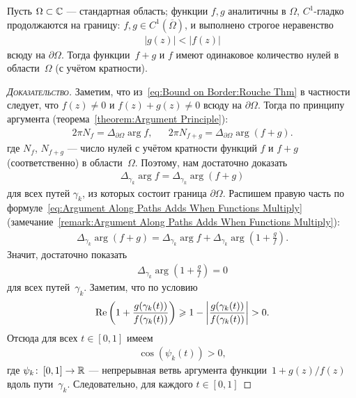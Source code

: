 \documentclass[../complex-analysis.tex]{subfiles}
\begin{document}
\begin{thm}[Руше]
 \label{theorem:Rouche}
 Пусть $ \Omega \subset \mathbb{C} $ --- стандартная область; функции $ f,g $ аналитичны в $ \Omega $, $ C^{1} $-гладко продолжаются на границу: $ f,g \in C^{1}(\overline\Omega) $, и выполнено строгое неравенство
 \begin{align}
  \label{eq:Bound on Border:Rouche Thm}
  \left| g(z) \right| < \left| f(z) \right|
 \end{align}
 всюду на $ \partial \Omega $. Тогда функции~$ f + g $ и $ f $ имеют одинаковое количество нулей в области~$ \Omega $ (с учётом кратности).
\end{thm}
\begin{proof}[\normalfont\textsc{Доказательство}]
 Заметим, что из~\eqref{eq:Bound on Border:Rouche Thm} в частности следует, что $ f(z) \neq 0 $ и $ f(z) + g(z) \neq 0 $ всюду на $ \partial\Omega $. Тогда по принципу аргумента (теорема~\ref{theorem:Argument Principle}):
 \begin{align*} 2\pi N_f = \Delta_{\partial\Omega} \arg f, && 2\pi N_{f+g} = \Delta_{\partial\Omega}\arg(f+g).
 \end{align*} где $ N_f $, $ N_{f+g} $ --- число нулей с учётом кратности функций $ f $ и $ f+g $ (соответственно) в области~$ \Omega $. Поэтому, нам достаточно доказать
 \begin{align*}
  \Delta_{\gamma_k} \arg f = \Delta_{\gamma_k} \arg (f+g)
 \end{align*} для всех путей $ \gamma_k $, из которых состоит граница $ \partial\Omega $. Распишем правую часть по формуле~\eqref{eq:Argument Along Paths Adds When Functions Multiply} (замечание~\ref{remark:Argument Along Paths Adds When Functions Multiply}):
 \begin{align*}
  \Delta_{\gamma_k} \arg (f+g)  = \Delta_{\gamma_k} \arg f + \Delta_{\gamma_k} \arg \left( 1 + \frac{g}{f}\right).
 \end{align*} Значит, достаточно показать
 \begin{align*}
  \Delta_{\gamma_k} \arg \left( 1 + \frac{g}{f} \right) = 0
 \end{align*} для всех путей~$ \gamma_k $. Заметим, что по условию
 \begin{align*}
  \operatorname{Re} \left(1 + \frac{g(\gamma_k(t))}{f(\gamma_k(t))}\right) \geqslant 1 - \left| \frac{g(\gamma_k(t))}{f(\gamma_k(t))} \right| > 0.
 \end{align*} Отсюда для всех $ t \in [0,1] $ имеем
 \begin{align*}
  \cos(\psi_k(t)) > 0,
 \end{align*} где $ \psi_k\colon\,[0,1]\to\mathbb{R} $ --- непрерывная ветвь аргумента функции~$ 1 + g(z) / f(z) $ вдоль пути~$ \gamma_k $. Следовательно, для каждого $ t \in [0,1] $

\end{proof}
\end{document}
